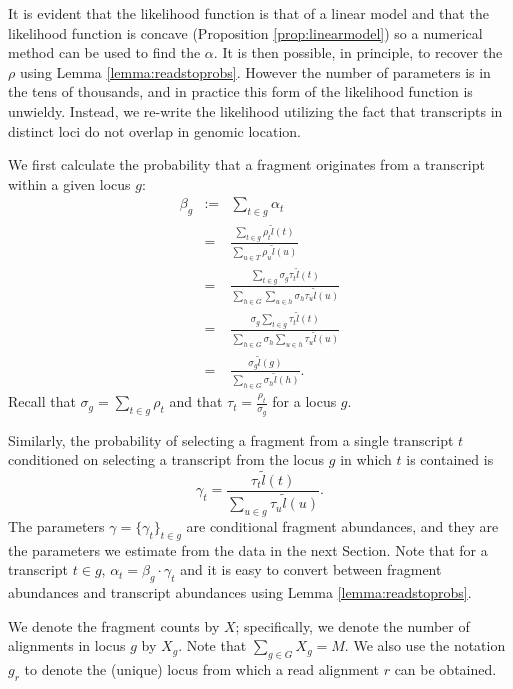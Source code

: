 \documentclass[12pt]{amsart}
\theoremstyle{definition}
\begin{document}
It is evident that the likelihood function is that of a linear model
and  that the likelihood function is
concave (Proposition \ref{prop:linearmodel}) so a numerical method can be used
to find the $\alpha$. It is then possible, in principle, to recover the $\rho$
using Lemma \ref{lemma:readstoprobs}. However the number of parameters is in the tens of
thousands, and in practice this form of the likelihood function is unwieldy.
Instead, we re-write the likelihood utilizing the fact that transcripts in
distinct loci do not overlap in genomic location.

We first calculate the  probability that a fragment originates from a transcript within a given locus $g$:
\begin{eqnarray}
\beta_g & := &  \sum_{t \in g} \alpha_t\\
& = & \frac{\sum_{t \in g} \rho_t \tilde{l}(t)}{\sum_{u \in T} \rho_u \tilde{l}(u)}\\
& = & \frac{\sum_{t \in g} \sigma_g\tau_t \tilde{l}(t)}{\sum_{h \in G} \sum_{u \in h} \sigma_h\tau_u \tilde{l}(u)}\\
& = & \frac{\sigma_g\sum_{t \in g} \tau_t \tilde{l}(t)}{\sum_{h \in G} \sigma_h \sum_{u \in h} \tau_u \tilde{l}(u)}\\
 & = &  \frac{\sigma_g \tilde{l}(g)}{\sum_{h \in G} \sigma_h \tilde{l}(h)}. 
\end{eqnarray}
Recall that $\sigma_g = \sum_{t \in g} \rho_t$ and that $\tau_t = \frac{\rho_t}{\sigma_g}$ for a locus $g$. 

Similarly, the probability of selecting a fragment from a single transcript $t$ conditioned on selecting a transcript from the locus $g$ in which $t$ is contained is
\begin{equation}
\label{eq:gammatau}
\gamma_t = \frac{\tau_t \tilde{l}(t)}{\sum_{u \in g} \tau_u \tilde{l}(u)}. 
\end{equation}
The parameters $\gamma=\{\gamma_t\}_{t \in g}$ are conditional fragment abundances, and they are the parameters we estimate from the data in the next Section. Note that for a transcript $t \in g$, $\alpha_t = \beta_g \cdot \gamma_t$ and it is easy to convert between fragment abundances and transcript abundances using Lemma \ref{lemma:readstoprobs}.

We denote the fragment counts by $X$; specifically, we denote the number of
alignments in locus $g$ by $X_g$. Note that $\sum_{g \in G} X_g = M$. We also
use the notation $g_r$ to denote the (unique) locus from which a read
alignment $r$ can be obtained.
\end{document}
